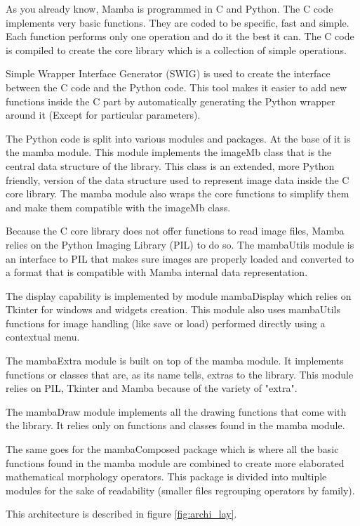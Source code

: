 \documentclass[a4paper,10pt,oneside]{article}
\begin{document}
As you already know, Mamba is programmed in C and Python. The C code implements
very basic functions. They are coded to be specific, fast and simple. Each 
function performs only one operation and do it the best it can. The C code is 
compiled to create the core library which is a collection of simple operations.

Simple Wrapper Interface Generator (SWIG) is used to create the interface 
between the C code and the Python code. This tool makes it easier to add new
functions inside the C part by automatically generating the Python wrapper
around it (Except for particular parameters).

The Python code is split into various modules and packages. At the base
of it is the mamba module. This module implements the imageMb class that is the
central data structure of the library. This class is an extended, more Python
friendly, version of the data structure used to represent image data inside the
C core library. The mamba module also wraps the core functions to simplify them
and make them compatible with the imageMb class.

Because the C core library does not offer functions to read image files, Mamba
relies on the Python Imaging Library (PIL) to do so. The mambaUtils module is
an interface to PIL that makes sure images are properly loaded and converted to 
a format that is compatible with Mamba internal data representation.

The display capability is implemented by module mambaDisplay which relies on
Tkinter for windows and widgets creation. This module also uses mambaUtils 
functions for image handling (like save or load) performed directly using
a contextual menu.

The mambaExtra module is built on top of the mamba module. It implements
functions or classes that are, as its name tells, extras to the library. This
module relies on PIL, Tkinter and Mamba because of the variety of "extra".

The mambaDraw module implements all the drawing functions that come with the
library. It relies only on functions and classes found in the mamba module.

The same goes for the mambaComposed package which is where all the basic
functions found in the mamba module are combined to create more elaborated
mathematical morphology operators. This package is divided into multiple
modules for the sake of readability (smaller files regrouping operators by
family).

This architecture is described in figure \ref{fig:archi_lay}.
\end{document}
